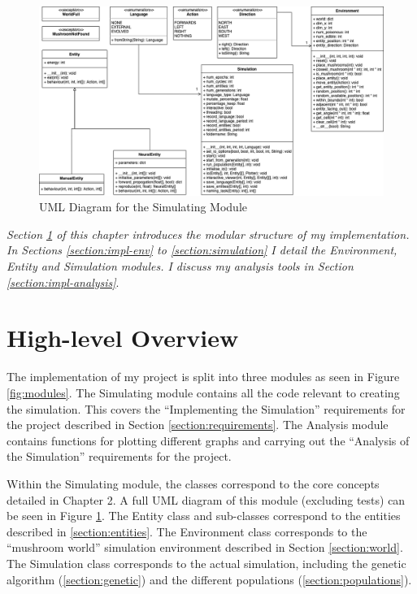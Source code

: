 \documentclass[12pt,a4paper,twoside,openright]{report}
\begin{document}
\begin{figure}[t]
  \centering
  \includegraphics[width=1.\linewidth]{figs/uml}
  \caption{UML Diagram for the Simulating Module}
  \label{fig:uml}
\end{figure}


\emph{Section \ref{section:impl-high} of this chapter introduces the modular structure of my implementation. In Sections \ref{section:impl-env} to \ref{section:simulation} I detail the Environment, Entity and Simulation modules. I discuss my analysis tools in Section \ref{section:impl-analysis}}.

\section{High-level Overview}\label{section:impl-high}

The implementation of my project is split into three modules as seen in Figure \ref{fig:modules}. The Simulating module contains all the code relevant to creating the simulation. This covers the ``Implementing the Simulation'' requirements for the project described in Section \ref{section:requirements}. The Analysis module contains functions for plotting different graphs and carrying out the ``Analysis of the Simulation'' requirements for the project.

Within the Simulating module, the classes correspond to the core concepts detailed in Chapter 2. A full UML diagram of this module (excluding tests) can be seen in Figure \ref{fig:uml}. The Entity class and sub-classes correspond to the entities described in \ref{section:entities}. The Environment class corresponds to the ``mushroom world'' simulation environment described in Section \ref{section:world}. The Simulation class corresponds to the actual simulation, including the genetic algorithm (\ref{section:genetic}) and the different populations (\ref{section:populations}).
\end{document}
